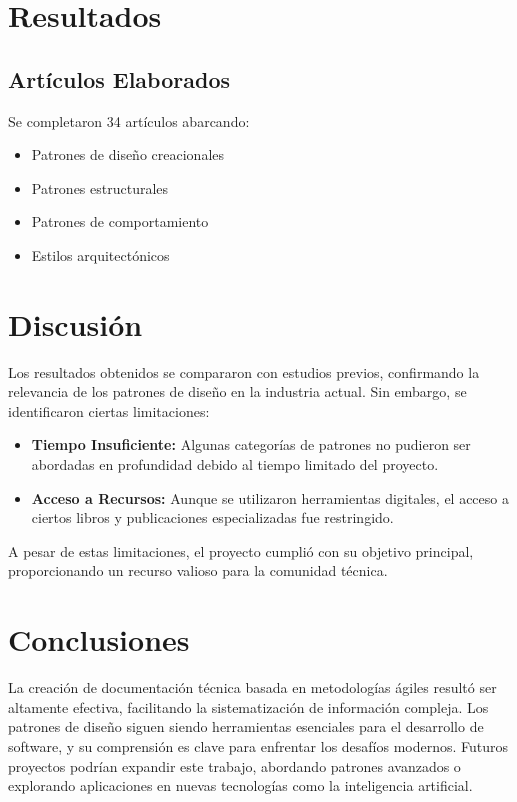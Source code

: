 \documentclass[12pt, a4paper]{article}
\begin{document}
\section{Resultados}
\subsection{Artículos Elaborados}
Se completaron 34 artículos abarcando:
\begin{itemize}
    \item Patrones de diseño creacionales
    \item Patrones estructurales
    \item Patrones de comportamiento
    \item Estilos arquitectónicos
\end{itemize}

\section{Discusión}

Los resultados obtenidos se compararon con estudios previos, confirmando la relevancia de los patrones de diseño en la industria actual. Sin embargo, se identificaron ciertas limitaciones:
\begin{itemize}
    \item \textbf{Tiempo Insuficiente:} Algunas categorías de patrones no pudieron ser abordadas en profundidad debido al tiempo limitado del proyecto.
    \item \textbf{Acceso a Recursos:} Aunque se utilizaron herramientas digitales, el acceso a ciertos libros y publicaciones especializadas fue restringido.
\end{itemize}

A pesar de estas limitaciones, el proyecto cumplió con su objetivo principal, proporcionando un recurso valioso para la comunidad técnica.

\section{Conclusiones}
La creación de documentación técnica basada en metodologías ágiles resultó ser altamente efectiva, facilitando la sistematización de información compleja.
Los patrones de diseño siguen siendo herramientas esenciales para el desarrollo de software, y su comprensión es clave para enfrentar los desafíos modernos. Futuros proyectos podrían expandir este trabajo, abordando patrones avanzados o explorando aplicaciones en nuevas tecnologías como la inteligencia artificial.




\cite{astudillo2014arquitectura, castro2023atencion, cechich2001especificacion, control_chaos2024, cortez2012perfiles, daza2013desarrollo, fernandez2006arquitectura, gil2006uml, navarro2017integracion, navarro2024mejores ,romero2005arquitectura} 
\end{document}
